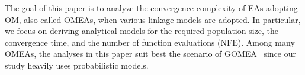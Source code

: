 \documentclass{sig-alternate}
\begin{document}


The goal of this paper is to analyze the convergence complexity of EAs adopting OM,
also called OMEAs, when various linkage models are adopted.
In particular, we focus on deriving analytical models for
the required population size, the convergence time, and the number of function evaluations (NFE).
%
%
Among many OMEAs, the analyses in this paper suit best the scenario of GOMEA~\cite{2011_OMEA}
since our study heavily uses probabilistic models.

\end{document}
